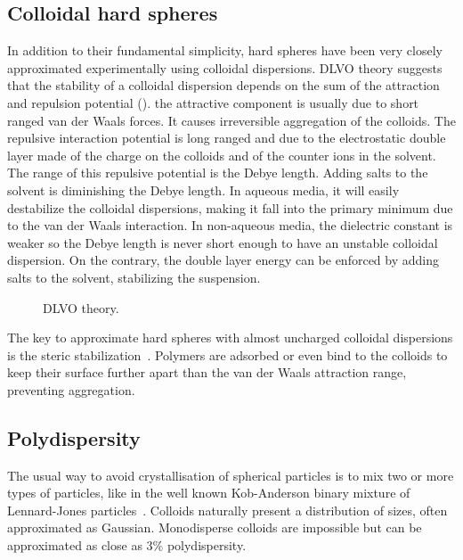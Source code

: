 \subsection{Colloidal hard spheres}
\label{sec:colloidalHS}
In addition to their fundamental simplicity, hard spheres have been very closely approximated experimentally using colloidal dispersions. \ac{DLVO} theory suggests that the stability of a colloidal dispersion depends on the sum of the attraction and repulsion potential (). the attractive component is usually due to short ranged van der Waals forces. It causes irreversible aggregation of the colloids. The repulsive interaction potential is long ranged and due to the electrostatic double layer made of the charge on the colloids and of the counter ions in the solvent. The range of this repulsive potential is the Debye length. Adding salts to the solvent is diminishing the Debye length. In aqueous media, it will easily destabilize the colloidal dispersions, making it fall into the primary minimum due to the van der Waals interaction. In non-aqueous media, the dielectric constant is weaker so the Debye length is never short enough to have an unstable colloidal dispersion. On the contrary, the double layer energy can be enforced by adding salts to the solvent, stabilizing the suspension.

\begin{figure}
	\centering
	\caption{\acl{DLVO} theory.}
	\label{fig:DLVO-theory}
\end{figure}

The key to approximate hard spheres with almost uncharged colloidal dispersions is the steric stabilization~\citep{pusey1986}. Polymers are adsorbed or even bind to the colloids to keep their surface further apart than the van der Waals attraction range, preventing aggregation.

\subsection{Polydispersity}
\label{sec:poly}
The usual way to avoid crystallisation of spherical particles is to mix two or more types of particles, like in the well known Kob-Anderson binary mixture of Lennard-Jones particles~\citep{kob1995tmc}. Colloids naturally present a distribution of sizes, often approximated as Gaussian. Monodisperse colloids are impossible but can be approximated as close as $3\%$ polydispersity. 

